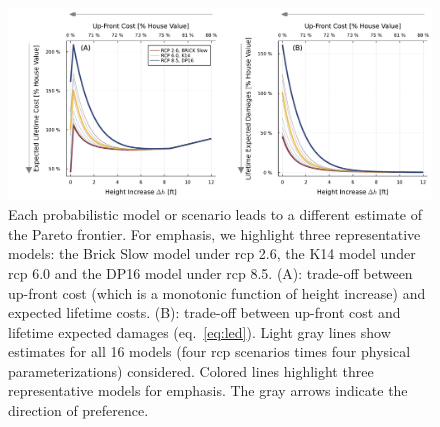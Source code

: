 \documentclass{agujournal2019}
\begin{document}
\begin{figure}
  \centering
  \includegraphics[width=\textwidth]{tradeoffs-by-rcp}
  \caption{
    Each probabilistic model or scenario leads to a different estimate of the Pareto frontier.
    For emphasis, we highlight three representative models: the Brick Slow model \protect\cite{wong_brick0.2:2017} under \gls{rcp} 2.6, the K14 \protect\cite{kopp_probabilistic:2014} model under \gls{rcp} 6.0 and the DP16 model \protect\cite{deconto_antarctica:2016,kopp_evolving:2017} under \gls{rcp} 8.5.
    (A): trade-off between up-front cost (which is a monotonic function of height increase) and expected lifetime costs.
    (B): trade-off between up-front cost and lifetime expected damages (eq.~\ref{eq:led}).
    Light gray lines show estimates for all 16 models (four \gls{rcp} scenarios times four physical parameterizations) considered.
    Colored lines highlight three representative models for emphasis.
    The gray arrows indicate the direction of preference.
  }\label{fig:tradeoffs-by-rcp}
\end{figure}
\end{document}

